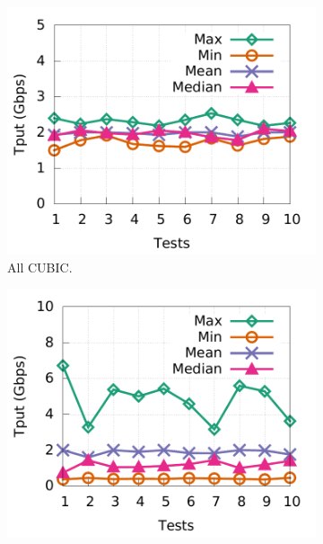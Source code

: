 \begin{figure}[!htb]
        \centering
        \begin{subfigure}[b]{0.24\textwidth}
                \centering
                \includegraphics[width=\textwidth]{figures/tput_fairness/default_all_cubic_tput.pdf}
                \caption{All CUBIC.}
                \label{fairness_all_cubic}
        \end{subfigure}
        \begin{subfigure}[b]{0.24\textwidth}
                \centering
                \includegraphics[width=\textwidth]{figures/tput_fairness/default_5CC_tput.pdf}

\end{subfigure}
\end{figure}
